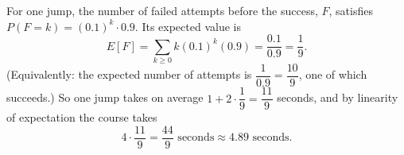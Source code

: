 For one jump, the number of failed attempts before the success, $F$, satisfies $P(F=k)=(0.1)^k\cdot0.9$. Its expected value is
\[E[F]=\sum_{k\ge0}k(0.1)^k(0.9)=\dfrac{0.1}{0.9}=\dfrac19.\]
(Equivalently: the expected number of attempts is $\dfrac{1}{0.9}=\dfrac{10}9$, one of which succeeds.) So one jump takes on average $1+2\cdot\dfrac19=\dfrac{11}9$ seconds, and by linearity of expectation the course takes
\[4\cdot\dfrac{11}{9}=\boxed{\dfrac{44}{9}\text{ seconds}}\approx4.89\text{ seconds}.\]
